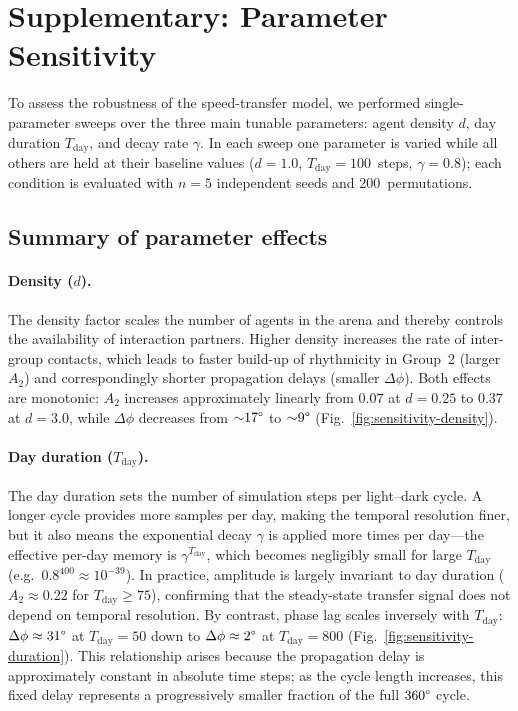 \documentclass[11pt]{article}
\begin{document}
\section*{Supplementary: Parameter Sensitivity}

To assess the robustness of the speed-transfer model, we performed
single-parameter sweeps over the three main tunable parameters: agent density
$d$, day duration $T_{\mathrm{day}}$, and decay rate $\gamma$.  In each sweep
one parameter is varied while all others are held at their baseline values
($d{=}1.0$, $T_{\mathrm{day}}{=}100$~steps, $\gamma{=}0.8$); each condition
is evaluated with $n{=}5$ independent seeds and 200~permutations.

\subsection*{Summary of parameter effects}

\paragraph{Density ($d$).}
The density factor scales the number of agents in the arena and thereby controls
the availability of interaction partners.  Higher density increases the rate
of inter-group contacts, which leads to faster build-up of rhythmicity in
Group~2 (larger $A_2$) and correspondingly shorter propagation delays (smaller
$\Delta\phi$).  Both effects are monotonic: $A_2$ increases
approximately linearly from $0.07$ at $d{=}0.25$ to $0.37$ at $d{=}3.0$,
while $\Delta\phi$ decreases from ${\sim}17\text{\textdegree}$ to
${\sim}9\text{\textdegree}$ (Fig.~\ref{fig:sensitivity-density}).

\paragraph{Day duration ($T_{\mathrm{day}}$).}
The day duration sets the number of simulation steps per light--dark cycle.  A
longer cycle provides more samples per day, making the temporal resolution
finer, but it also means the exponential decay $\gamma$ is applied more times
per day---the effective per-day memory is $\gamma^{T_{\mathrm{day}}}$, which
becomes negligibly small for large $T_{\mathrm{day}}$ (e.g.\
$0.8^{400}\!\approx\!10^{-39}$).  In practice, amplitude is largely invariant
to day duration ($A_2 \approx 0.22$ for $T_{\mathrm{day}} \geq 75$),
confirming that the steady-state transfer signal does not depend on temporal
resolution.  By contrast, phase lag scales inversely with $T_{\mathrm{day}}$:
$\Delta\phi \approx 31\text{\textdegree}$ at $T_{\mathrm{day}}{=}50$ down to
$\Delta\phi \approx 2\text{\textdegree}$ at $T_{\mathrm{day}}{=}800$
(Fig.~\ref{fig:sensitivity-duration}).  This relationship arises because the
propagation delay is approximately constant in absolute time steps; as the
cycle length increases, this fixed delay represents a progressively smaller
fraction of the full $360\text{\textdegree}$ cycle.
\end{document}
